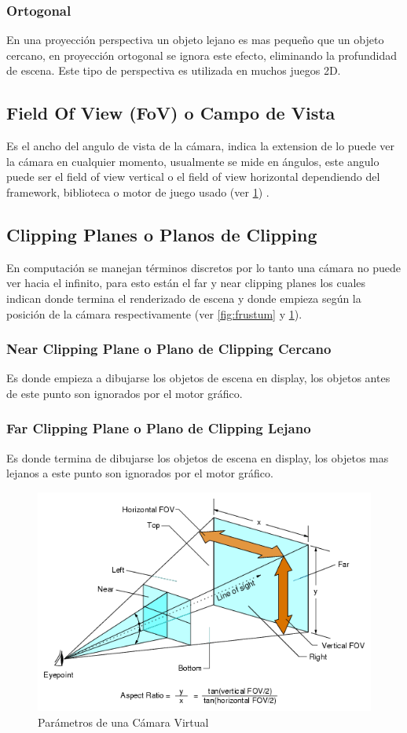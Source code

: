 \subsubsection{Ortogonal}
En una proyección perspectiva un objeto lejano es mas pequeño que un objeto cercano, en proyección ortogonal se ignora este efecto, eliminando la profundidad de escena. Este tipo de perspectiva es utilizada en muchos juegos 2D.
\subsection{Field Of View (FoV) o Campo de Vista}
\label{subsec:fov}
Es el ancho del angulo de vista de la cámara, indica la extension de lo puede ver la cámara en cualquier momento, usualmente se mide en ángulos, este angulo puede ser el field of view vertical o el field of view horizontal dependiendo del framework, biblioteca o motor de juego usado (ver \ref{fig:camera}) \cite{feng_fovy}.
\subsection{Clipping Planes o Planos de Clipping}
\label{subsec:clipping_planes}
En computación se manejan términos discretos por lo tanto una cámara no puede ver hacia el infinito, para esto están el far y near clipping planes los cuales indican donde termina el renderizado de escena y donde empieza según la posición de la cámara respectivamente (ver \ref{fig:frustum} y \ref{fig:camera}).
\subsubsection{Near Clipping Plane o Plano de Clipping Cercano}
Es donde empieza a dibujarse los objetos de escena en display, los objetos antes de este punto son ignorados por el motor gráfico.
\subsubsection{Far Clipping Plane o Plano de Clipping Lejano}
Es donde termina de dibujarse los objetos de escena en display, los objetos mas lejanos a este punto son ignorados por el motor gráfico.
\begin{figure}[H]
\centering
\includegraphics[width=0.9\linewidth]{media/camera.png} 
\caption{Parámetros de una Cámara Virtual}
\label{fig:camera}
\end{figure}
\newpage
